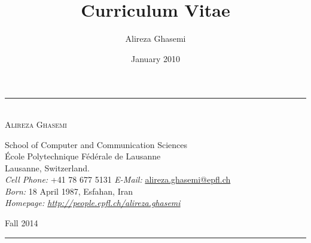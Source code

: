 \documentclass[a4paper]{article}
\title{Curriculum Vitae}
\date{January 2010}
\author{Alireza Ghasemi}
\newcounter{prob_num}
\newcommand{\HRule}{\rule{\linewidth}{0.5mm}}
\theoremstyle{definition}
\begin{document}
\begin{center}
\HRule \\[0.2cm]

{ \Huge{{\textsc{Alireza Ghasemi}}}}\\[0.2cm]

\begin{center} 
{\small School of Computer and Communication Sciences\\
\'{E}cole Polytechnique F\'{e}d\'{e}rale de Lausanne\\
Lausanne, Switzerland.\\[0.2cm]

\emph{Cell Phone:} +41 78 677 5131 \hfill
\emph{E-Mail:} \href{mailto:alireza.ghasemi@epfl.ch}{alireza.ghasemi@epfl.ch}\\
\emph{Born:} 18 April 1987, Esfahan, Iran\\
\emph{Homepage: \url{http://people.epfl.ch/alireza.ghasemi}} }

\end{center}
{\large Fall 2014}\\[0.2cm]
\HRule \\[0.2cm]

\end{center}

\setcounter{prob_num}{1}
\newcommand{\hlmar}[1]{\it{#1}\marginpar{#1}}
\end{document}
